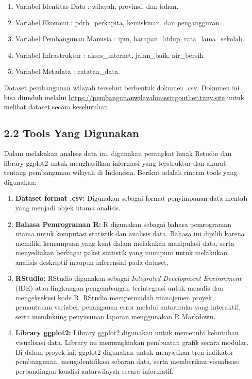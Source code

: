 \documentclass[
  12pt,
]{article}
\providecommand{\tightlist}{%
  \setlength{\itemsep}{0pt}\setlength{\parskip}{0pt}}
\begin{document}
\begin{enumerate}
\def\labelenumi{\arabic{enumi}.}
\tightlist
\item
  Variabel Identitas Data : wilayah, provinsi, dan tahun.
\item
  Variabel Ekonomi : pdrb\_perkapita, kemiskinan, dan pengangguran.
\item
  Variabel Pembangunan Manusia : ipm, harapan\_hidup,
  rata\_lama\_sekolah.
\item
  Variabel Infrastruktur : akses\_internet, jalan\_baik, air\_bersih.
\item
  Variabel Metadata : catatan\_data.
\end{enumerate}

Dataset pembangunan wilayah tersebut berbentuk dokumen .csv. Dokumen ini
bisa diunduh melalui
\url{https://pembangunanwilayahmissingoutlier.tiiny.site} untuk melihat
dataset secara keseluruhan.

\subsection{\texorpdfstring{\normalsize 2.2 \hspace {0,5cm} Tools Yang
Digunakan}{2.2  Tools Yang Digunakan}}\label{tools-yang-digunakan}

\vspace{-0.5cm}

Dalam melakukan analisis data ini, digunakan perangkat lunak Rstudio dan
library ggplot2 untuk menghasilkan informasi yang terstruktur dan akurat
tentang pembangunan wilayah di Indonesia. Berikut adalah rincian tools
yang digunakan:

\begin{enumerate}
\def\labelenumi{\arabic{enumi}.}
\tightlist
\item
  \textbf{Dataset format .csv:} Digunakan sebagai format penyimpanan
  data mentah yang menjadi objek utama analisis.
\item
  \textbf{Bahasa Pemrograman R:} R digunakan sebagai bahasa pemrograman
  utama untuk komputasi statistik dan analisis data. Bahasa ini dipilih
  karena memiliki kemampuan yang kuat dalam melakukan manipulasi data,
  serta menyediakan berbagai paket statistik yang mumpuni untuk
  melakukan analisis deskriptif maupun inferensial pada dataset.
\item
  \textbf{RStudio:} RStudio digunakan sebagai \emph{Integrated
  Development Environment} (IDE) atau lingkungan pengembangan
  terintegrasi untuk menulis dan mengeksekusi kode R. RStudio
  mempermudah manajemen proyek, pemantauan variabel, penanganan error
  melalui antarmuka yang interaktif, serta mendukung penyusunan laporan
  menggunakan R Markdown.
\item
  \textbf{Library ggplot2:} Library ggplot2 digunakan untuk memenuhi
  kebutuhan visualisasi data. Library ini memungkinkan pembuatan grafik
  secara modular. Di dalam proyek ini, ggplot2 digunakan untuk
  menyajikan tren indikator pembangunan, mengidentifikasi sebaran data,
  serta memberikan visualisasi perbandingan kondisi antarwilayah secara
  informatif.
\end{enumerate}
\end{document}
